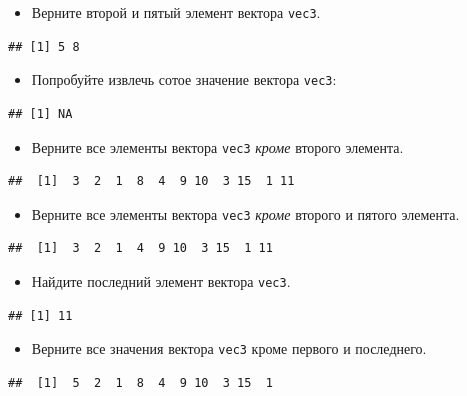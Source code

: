 \documentclass[]{book}
\providecommand{\tightlist}{%
  \setlength{\itemsep}{0pt}\setlength{\parskip}{0pt}}
\begin{document}
\begin{itemize}
\tightlist
\item
  Верните второй и пятый элемент вектора \texttt{vec3}.
\end{itemize}

\begin{verbatim}
## [1] 5 8
\end{verbatim}

\begin{itemize}
\tightlist
\item
  Попробуйте извлечь сотое значение вектора \texttt{vec3}:
\end{itemize}

\begin{verbatim}
## [1] NA
\end{verbatim}

\begin{itemize}
\tightlist
\item
  Верните все элементы вектора \texttt{vec3} \emph{кроме} второго
  элемента.
\end{itemize}

\begin{verbatim}
##  [1]  3  2  1  8  4  9 10  3 15  1 11
\end{verbatim}

\begin{itemize}
\tightlist
\item
  Верните все элементы вектора \texttt{vec3} \emph{кроме} второго и
  пятого элемента.
\end{itemize}

\begin{verbatim}
##  [1]  3  2  1  4  9 10  3 15  1 11
\end{verbatim}

\begin{itemize}
\tightlist
\item
  Найдите последний элемент вектора \texttt{vec3}.
\end{itemize}

\begin{verbatim}
## [1] 11
\end{verbatim}

\begin{itemize}
\tightlist
\item
  Верните все значения вектора \texttt{vec3} кроме первого и последнего.
\end{itemize}

\begin{verbatim}
##  [1]  5  2  1  8  4  9 10  3 15  1
\end{verbatim}
\end{document}
